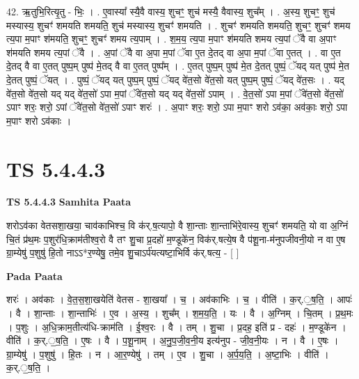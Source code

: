 \documentclass[17pt]{extarticle}
\begin{document}
42. ऋ॒तुभि॒रित्यृ॒तु - भिः॒ । . ए॒वास्या᳚ स्यै॒वै वास्य॒ शुचꣳ॒॒ शुच॑ मस्यै॒ वैवास्य॒ शुच᳚म् । . अ॒स्य॒ शुचꣳ॒॒ शुच॑ मस्यास्य॒ शुचꣳ॑ शमयति शमयति॒ शुच॑ मस्यास्य॒ शुचꣳ॑ शमयति । . शुचꣳ॑ शमयति शमयति॒ शुचꣳ॒॒ शुचꣳ॑ शमय त्य॒पा म॒पाꣳ श॑मयति॒ शुचꣳ॒॒ शुचꣳ॑ शमय त्य॒पाम् । . श॒म॒य॒ त्य॒पा म॒पाꣳ श॑मयति शमय त्य॒पां ॅवै वा अ॒पाꣳ श॑मयति शमय त्य॒पां ॅवै । . अ॒पां ॅवै वा अ॒पा म॒पां ॅवा ए॒त दे॒तद् वा अ॒पा म॒पां ॅवा ए॒तत् । . वा ए॒त दे॒तद् वै वा ए॒तत् पुष्प॒म् पुष्प॑ मे॒तद् वै वा ए॒तत् पुष्प᳚म् । . ए॒तत् पुष्प॒म् पुष्प॑ मे॒त दे॒तत् पुष्पं॒ ॅयद् यत् पुष्प॑ मे॒त दे॒तत् पुष्पं॒ ॅयत् । . पुष्पं॒ ॅयद् यत् पुष्प॒म् पुष्पं॒ ॅयद् वे॑त॒सो वे॑त॒सो यत् पुष्प॒म् पुष्पं॒ ॅयद् वे॑त॒सः । . यद् वे॑त॒सो वे॑त॒सो यद् यद् वे॑त॒सो॑ ऽपा म॒पां ॅवे॑त॒सो यद् यद् वे॑त॒सो॑ ऽपाम् । . वे॒त॒सो॑ ऽपा म॒पां ॅवे॑त॒सो वे॑त॒सो॑ ऽपाꣳ शरः॒ शरो॒ ऽपां ॅवे॑त॒सो वे॑त॒सो॑ ऽपाꣳ शरः॑ । . अ॒पाꣳ शरः॒ शरो॒ ऽपा म॒पाꣳ शरो ऽव॑का॒ अव॑काः॒ शरो॒ ऽपा म॒पाꣳ शरो ऽव॑काः । \newline
\pagebreak
{}

\section{ TS 5.4.4.3 }

\textbf{TS 5.4.4.3 } \newline
\textbf{Samhita Paata} \newline

शरोऽव॑का वेतसशा॒खया॒ चाव॑काभिश्च॒ वि क॑र्.ष॒त्यापो॒ वै शा॒न्ताः शा॒न्ताभि॑रे॒वास्य॒ शुचꣳ॑ शमयति॒ यो वा अ॒ग्निं चि॒तं प्र॑थ॒मः प॒शुर॑धि॒क्राम॑तीश्व॒रो वै तꣳ शु॒चा प्र॒दहो॑ म॒ण्डूके॑न॒ विक॑र्.षत्ये॒ष वै प॑शू॒ना-म॑नुपजीवनी॒यो न वा ए॒ष ग्रा॒म्येषु॑ प॒शुषु॑ हि॒तो नाऽऽ*र॒ण्येषु॒ तमे॒व शु॒चाऽर्प॑यत्यष्टा॒भिर्वि क॑र्.षत्य॒ - [  ] \newline

\textbf{Pada Paata} \newline

शरः॑ । अव॑काः । वे॒त॒स॒शा॒खयेति॑ वेतस - शा॒खया᳚ । च॒ । अव॑काभिः । च॒ । वीति॑ । क॒र्.॒ष॒ति॒ । आपः॑ । वै । शा॒न्ताः । शा॒न्ताभिः॑ । ए॒व । अ॒स्य॒ । शुच᳚म् । श॒म॒य॒ति॒ । यः । वै । अ॒ग्निम् । चि॒तम् । प्र॒थ॒मः । प॒शुः । अ॒धि॒क्राम॒तीत्य॑धि-क्राम॑ति । ई॒श्व॒रः । वै । तम् । शु॒चा । प्र॒दह॒ इति॑ प्र - दहः॑ । म॒ण्डूके॑न । वीति॑ । क॒र्.॒ष॒ति॒ । ए॒षः । वै । प॒शू॒नाम् । अ॒नु॒प॒जी॒व॒नी॒य इत्य॑नुप -  जी॒व॒नी॒यः । न । वै । ए॒षः । ग्रा॒म्येषु॑ । प॒शुषु॑ । हि॒तः । न । आ॒र॒ण्येषु॑ । तम् । ए॒व । शु॒चा । अ॒र्प॒य॒ति॒ । अ॒ष्टा॒भिः । वीति॑ । क॒र्.॒ष॒ति॒ ।  \newline
\end{document}
